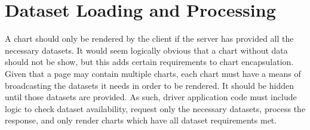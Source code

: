 \section{Dataset Loading and Processing}
A chart should only be rendered by the client if the server has provided all the necessary datasets.  It would seem logically obvious that a chart without data should not be show, but this adds certain requirements to chart encapsulation.  Given that a page may contain multiple charts, each chart must have a means of broadcasting the datasets it needs in order to be rendered.  It should be hidden until those datasets are provided.  As such, driver application code must include logic to check dataset availability, request only the necessary datasets, process the response, and only render charts which have all dataset requirements met. \par
